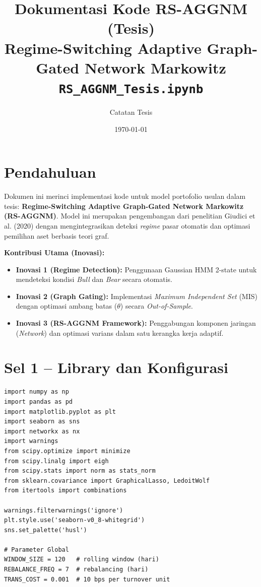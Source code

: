 \documentclass[12pt,a4paper]{article}
\title{\textbf{Dokumentasi Kode RS-AGGNM (Tesis)} \\ \large Regime-Switching Adaptive Graph-Gated Network Markowitz \\
\small \texttt{RS\_AGGNM\_Tesis.ipynb}}
\author{Catatan Tesis}
\date{\today}
\begin{document}
\maketitle
\tableofcontents
\newpage

\section{Pendahuluan}
Dokumen ini merinci implementasi kode untuk model portofolio usulan dalam tesis: \textbf{Regime-Switching Adaptive Graph-Gated Network Markowitz (RS-AGGNM)}. Model ini merupakan pengembangan dari penelitian Giudici et al. (2020) dengan mengintegrasikan deteksi \textit{regime} pasar otomatis dan optimasi pemilihan aset berbasis teori graf.

\textbf{Kontribusi Utama (Inovasi):}
\begin{itemize}
    \item \textbf{Inovasi 1 (Regime Detection):} Penggunaan Gaussian HMM 2-state untuk mendeteksi kondisi \textit{Bull} dan \textit{Bear} secara otomatis.
    \item \textbf{Inovasi 2 (Graph Gating):} Implementasi \textit{Maximum Independent Set} (MIS) dengan optimasi ambang batas ($\theta$) secara \textit{Out-of-Sample}.
    \item \textbf{Inovasi 3 (RS-AGGNM Framework):} Penggabungan komponen jaringan (\textit{Network}) dan optimasi varians dalam satu kerangka kerja adaptif.
\end{itemize}

\section{Sel 1 -- Library dan Konfigurasi}
\begin{lstlisting}[caption={Import library dan parameter global}]
import numpy as np
import pandas as pd
import matplotlib.pyplot as plt
import seaborn as sns
import networkx as nx
import warnings
from scipy.optimize import minimize
from scipy.linalg import eigh
from scipy.stats import norm as stats_norm
from sklearn.covariance import GraphicalLasso, LedoitWolf
from itertools import combinations

warnings.filterwarnings('ignore')
plt.style.use('seaborn-v0_8-whitegrid')
sns.set_palette('husl')

# Parameter Global
WINDOW_SIZE = 120   # rolling window (hari)
REBALANCE_FREQ = 7  # rebalancing (hari)
TRANS_COST = 0.001  # 10 bps per turnover unit
\end{lstlisting}
\end{document}
